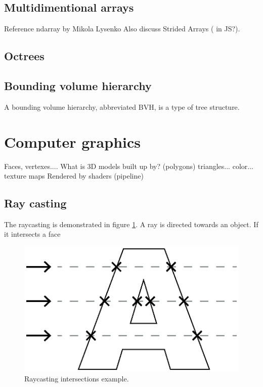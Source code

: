 \subsection{Multidimentional arrays}
Reference ndarray by Mikola Lysenko
Also discuss Strided Arrays ( in JS?).

\subsection{Octrees}

\subsection{Bounding volume hierarchy }
A bounding volume hierarchy, abbreviated BVH, is a type of tree structure.

\section{Computer graphics}
Faces, vertexes.... What is 3D models built up by? (polygons) triangles... color...
texture maps
Rendered by shaders (pipeline)

\subsection{Ray casting}
The raycasting is demonstrated in figure \ref{fig:raycasting-intersections-example}. A ray is directed towards an object. If it intersects a face

\begin{figure}[h]
    \centering
    \includegraphics[scale=0.8]{sections/methodology/figures/raycast-intersections}
    \caption{Raycasting intersections example.}
    \label{fig:raycasting-intersections-example}
\end{figure}

